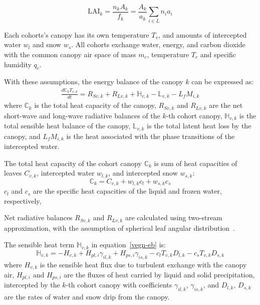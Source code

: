 \documentclass{article}
\newcommand{\wl}{w_l}
\newcommand{\ws}{w_s}
\newcommand{\wlk}{w_{l,k}}
\newcommand{\wsk}{w_{s,k}}
\newcommand{\LAI}{\ensuremath{\text{LAI}}}
\newcommand{\fderiv}[2]{\frac{d #1}{d #2}} %
\newcommand{\nindivs}{n}         %
\newcommand{\crownArea}{a}       %
\newcommand{\layerfrac}{f}       %
\newcommand{\intercept}{\gamma}  %
\begin{document}
\begin{equation}
   \LAI_k = \frac{\nindivs_k A_k}{\layerfrac_k}
         = \frac{A_k}{\crownArea_k}\sum_{i \in L}\nindivs_i\crownArea_i
\end{equation}

Each cohorts's canopy has its own temperature $T_v$, and amounts of intercepted water
$\wl$ and snow $\ws$. All cohorts exchange water, energy, and carbon dioxide with the common 
canopy air space of mass $m_c$, temperature $T_c$ and specific 
humidity $q_c$.


With these assumptions, the energy balance of the canopy $k$ can be expressed as:
%
\begin{align}\label{vegn-eb}
   \fderiv{\mathbb{C}_k T_{v,k}}{t} = R_{Sv,k} + R_{Lv,k} + 
        \mathbb{H}_{v,k} - \mathbb{L}_{v,k} - L_f M_{i,k}
\end{align}
where $\mathbb{C}_k$ is the total heat capacity of the canopy, 
$R_{Sv,k}$ and $R_{Lv,k}$ are the net short-wave and long-wave radiative balances of the $k$-th cohort canopy,
$\mathbb{H}_{v,k}$ is the total sensible heat balance of the canopy, 
$\mathbb{L}_{v,k}$ is the total latent heat loss by the canopy,
and
$L_f M_{i,k}$ is the heat associated with the phase transitions of the intercepted water.

The total heat capacity of the cohort canopy $\mathbb{C}_k$ is sum of heat
capacities of leaves $C_{v,k}$, intercepted water $\wlk$, and intercepted snow
$\wsk$:
\begin{equation}
  \mathbb{C}_k = C_{v,k} + \wlk c_l + \wsk c_s
\end{equation}
%
$c_l$ and $c_s$ are the specific heat capacities of the liquid and frozen water, respectively,

Net radiative balances $R_{Sv,k}$ and $R_{Lv,k}$ are calculated using two-stream
approximation, with the assumption of spherical leaf angular distribution~\cite{Pinty-Lavergne-etal-2006}.

The sensible heat term $\mathbb{H}_{v,k}$ in equation~\eqref{vegn-eb} is:
%
\begin{equation}
   \mathbb{H}_{v,k} = - H_{v,k} + H_{pl,i} \intercept_{il,k} + H_{ps,i} \intercept_{is,k} 
   - c_l T_{v,k} D_{l,k} - c_s T_{v,k} D_{s,k}
\end{equation}
%
where $H_{v,k}$ is the sensible heat flux due to turbulent exchange with the canopy air,
$H_{pl,i}$ and $H_{ps,i}$ are the fluxes of heat carried by liquid and solid precipitation,
intercepted by the $k$-th cohort canopy with coefficients $\intercept_{il,k}$,
$\intercept_{is,k}$, 
and $D_{l,k}$, $D_{s,k}$ are the rates of water and snow drip from the canopy.
\end{document}
